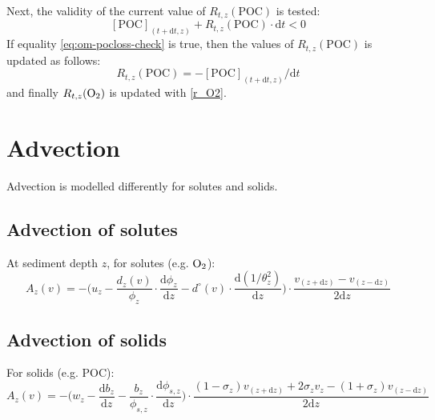 \documentclass[a4paper]{article}
\newcommand{\D}[1]{\mathrm{d}#1}
\newcommand{\dydx}[2]{\frac{\D{#1}}{\D{#2}}}
\begin{document}
Next, the validity of the current value of $R_{t,z}(\mathrm{POC})$ is tested:
\begin{equation}\label{eq:om-pocloss-check}
[\mathrm{POC}]_{(t+\D{t}, z)} + R_{t,z}(\mathrm{POC}) \cdot \D{t} < 0
\end{equation}
If equality \eqref{eq:om-pocloss-check} is true, then the values of $R_{t,z}(\mathrm{POC})$ is updated as follows:
\begin{equation}
R_{t,z}(\mathrm{POC}) = -[\mathrm{POC}]_{(t+\D{t}, z)} / \D{t}
\end{equation}
and finally $R_{t,z}(\ce{O2})$ is updated with \eqref{r_O2}.


\section{Advection}\label{sx:advection}

Advection is modelled differently for solutes and solids.


\subsection{Advection of solutes}

At sediment depth $z$, for solutes (e.g. $\ce{O2}$):
\begin{equation}
A_z(v) = -\Bigg( u_z - \frac{d_z(v)}{\phi_z} \cdot \dydx{\phi_z}{z} - d^\circ(v) \cdot \dydx{(1/\theta_z^2)}{z} \Bigg) \cdot \frac{v_{(z+\D{z})} - v_{(z-\D{z})}}{2\D{z}}
\end{equation}


\subsection{Advection of solids}

For solids (e.g. POC):
\begin{equation}
A_z(v) = -\Bigg( w_z - \dydx{b_z}{z} - \frac{b_z}{\phi_{s,z}} \cdot \dydx{\phi_{s,z}}{z} \Bigg) \cdot \frac{(1 - \sigma_z) v_{(z+\D{z})} + 2 \sigma_z v_z - (1 + \sigma_z) v_{(z-\D{z})}}{2\D{z}}
\end{equation}
\end{document}
